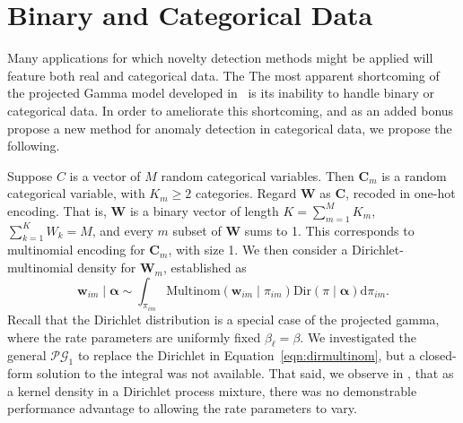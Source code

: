 \section{Binary and Categorical Data\label{sec:categorical}}
Many applications for which novelty detection methods might be applied will 
    feature both real and categorical data.  The  The most apparent 
    shortcoming of the projected Gamma model developed in~\cite{trubey:pg} is
    its inability to handle binary or categorical data.  In order to ameliorate this
    shortcoming, and as an added bonus propose a new method for anomaly detection in
    categorical data, we propose the following.

Suppose $C$ is a vector of $M$ random categorical variables.  Then $\bm{C}_{m}$ 
    is a random categorical variable, with $K_{m} \geq 2$ categories. Regard $\bm{W}$ 
    as $\bm{C}$, recoded in one-hot encoding.  That is, $\bm{W}$ is a binary vector of 
    length $K = \sum_{m = 1}^M K_{m}$, $\sum_{k = 1}^K W_k = M$, and every $m$ subset 
    of $\bm{W}$ sums to 1.  This corresponds to multinomial encoding for $\bm{C}_m$,
    with size 1. We then consider a Dirichlet-multinomial density for $\bm{W}_m$,
    established as
  \begin{equation}
    \label{eqn:dirmultinom}
    \bm{w}_{im}\mid\bm{\alpha} 
    \sim 
    \int_{\pi_{im}} 
    \text{Multinom}(\bm{w}_{im}\mid\pi_{im})
    \text{Dir}(\pi\mid\bm{\alpha})\text{d}\pi_{im}.
  \end{equation}
  Recall that the Dirichlet distribution is a special case of the projected gamma,
  where the rate parameters are uniformly fixed $\beta_{\ell} = \beta$.  We 
  investigated the general $\mathcal{PG}_1$ to replace the Dirichlet in 
  Equation~\ref{eqn:dirmultinom}, but a closed-form solution to the integral was 
  not available.  That said, we observe in \cite{trubey:pg}, that as a kernel 
  density in a Dirichlet process mixture, there was no demonstrable performance 
  advantage to allowing the rate parameters to vary.
 
